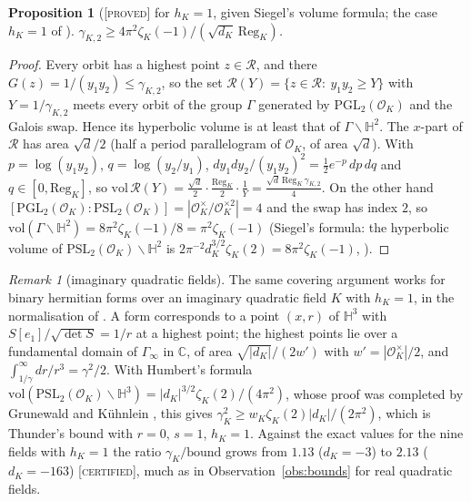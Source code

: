 \documentclass[11pt]{amsart}
\newtheorem{proposition}[theorem]{Proposition}
\theoremstyle{definition}
\theoremstyle{remark}
\newtheorem{remark}[theorem]{Remark}
\newcommand{\Hb}{\mathbb{H}}
\newcommand{\OK}{\mathcal{O}_K}
\newcommand{\PGL}{\mathrm{PGL}}
\newcommand{\PSL}{\mathrm{PSL}}
\newcommand{\Reg}{\mathrm{Reg}_K}
\newcommand{\gK}{\gamma_{K,2}}
\newcommand{\PROVED}{\textsc{[proved]}}
\newcommand{\CERT}{\textsc{[certified]}}
\begin{document}
\begin{proposition}[\PROVED{} for $h_K=1$, given Siegel's volume formula; the case $h_K=1$ of
\cite{Thunder}]\label{thm:lower}
$\gK\ge 4\pi^2\zeta_K(-1)/(\sqrt{d_K}\,\Reg)$.
\end{proposition}
\begin{proof}
Every orbit has a highest point $z\in\mathcal R$, and there $G(z)=1/(y_1y_2)\le\gK$, so the set
$\mathcal R(Y)=\{z\in\mathcal R:\ y_1y_2\ge Y\}$ with $Y=1/\gK$ meets every orbit of the group
$\Gamma$ generated by $\PGL_2(\OK)$ and the Galois swap.  Hence its hyperbolic volume is at least
that of $\Gamma\backslash\Hb^2$.  The $x$-part of $\mathcal R$ has area $\sqrt d/2$ (half a period
parallelogram of $\OK$, of area $\sqrt d$).  With $p=\log(y_1y_2)$, $q=\log(y_2/y_1)$,
$dy_1dy_2/(y_1y_2)^2=\tfrac12e^{-p}\,dp\,dq$ and $q\in[0,\Reg]$, so
$\mathrm{vol}\,\mathcal R(Y)=\frac{\sqrt d}2\cdot\frac{\Reg}{2}\cdot\frac1Y=\frac{\sqrt d\,\Reg\,\gK}4$.
On the other hand $[\PGL_2(\OK):\PSL_2(\OK)]=|\OK^\times/\OK^{\times2}|=4$ and the swap has index
$2$, so $\mathrm{vol}(\Gamma\backslash\Hb^2)=8\pi^2\zeta_K(-1)/8=\pi^2\zeta_K(-1)$ (Siegel's
formula: the hyperbolic volume of $\PSL_2(\OK)\backslash\Hb^2$ is $2\pi^{-2}d_K^{3/2}\zeta_K(2)
=8\pi^2\zeta_K(-1)$, \cite[\S1.3]{Hirzebruch}).
\end{proof}

\begin{remark}[imaginary quadratic fields]
The same covering argument works for binary hermitian forms over an imaginary quadratic field
$K$ with $h_K=1$, in the normalisation of \cite{CIL}.  A form corresponds to a point $(x,r)$ of
$\Hb^3$ with $S[e_1]/\sqrt{\det S}=1/r$ at a highest point; the highest points lie over a
fundamental domain of $\Gamma_\infty$ in $\mathbb C$, of area $\sqrt{|d_K|}/(2w')$ with
$w'=|\OK^\times|/2$, and $\int_{1/\gamma}^\infty dr/r^3=\gamma^2/2$.  With Humbert's formula
$\mathrm{vol}(\PSL_2(\OK)\backslash\Hb^3)=|d_K|^{3/2}\zeta_K(2)/(4\pi^2)$, whose proof was completed by
Grunewald and K\"uhnlein \cite{GK}, this gives
$\gamma_K^2\ge w_K\zeta_K(2)|d_K|/(2\pi^2)$, which is Thunder's bound \cite[Thm.~2]{Thunder} with $r=0$,
$s=1$, $h_K=1$.  Against the exact values for the nine fields with $h_K=1$ \cite[Table~1]{CIL} the
ratio $\gamma_K/\text{bound}$ grows from $1.13$ ($d_K=-3$) to $2.13$ ($d_K=-163$) \CERT, much as
in Observation~\ref{obs:bounds} for real quadratic fields.
\end{remark}
\end{document}
